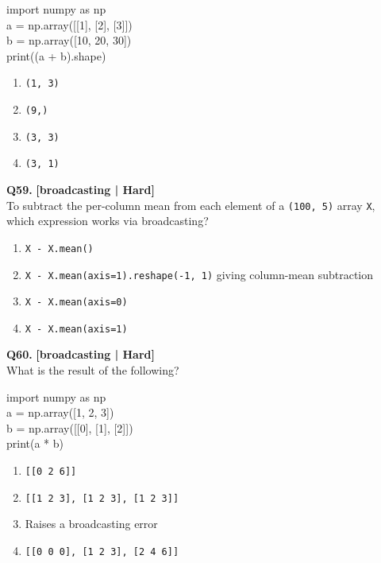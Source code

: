 \begin{pycode}
import numpy as np\\
a = np.array([[1], [2], [3]])\\
b = np.array([10, 20, 30])\\
print((a + b).shape)
\end{pycode}

\begin{enumerate}[label=(\alph*),topsep=2pt,itemsep=1pt,partopsep=0pt,parsep=0pt]
    \item \relax \texttt{(1, 3)}
    \item \relax \texttt{(9,)}
    \item \relax \texttt{(3, 3)}
    \item \relax \texttt{(3, 1)}
\end{enumerate}
\vspace{2mm}

\noindent\textbf{Q59.} \hfill {\small\color{LPUOrange}\textbf{[broadcasting | Hard]}}\\[2pt]
To subtract the per-column mean from each element of a \texttt{(100, 5)} array \texttt{X}, which expression works via broadcasting?

\begin{enumerate}[label=(\alph*),topsep=2pt,itemsep=1pt,partopsep=0pt,parsep=0pt]
    \item \relax \texttt{X - X.mean()}
    \item \relax \texttt{X - X.mean(axis=1).reshape(-1, 1)} giving column-mean subtraction
    \item \relax \texttt{X - X.mean(axis=0)}
    \item \relax \texttt{X - X.mean(axis=1)}
\end{enumerate}
\vspace{2mm}

\noindent\textbf{Q60.} \hfill {\small\color{LPUOrange}\textbf{[broadcasting | Hard]}}\\[2pt]
What is the result of the following? 

\begin{pycode}
import numpy as np\\
a = np.array([1, 2, 3])\\
b = np.array([[0], [1], [2]])\\
print(a * b)
\end{pycode}

\begin{enumerate}[label=(\alph*),topsep=2pt,itemsep=1pt,partopsep=0pt,parsep=0pt]
    \item \relax \texttt{[[0 2 6]]}
    \item \relax \texttt{[[1 2 3], [1 2 3], [1 2 3]]}
    \item \relax Raises a broadcasting error
    \item \relax \texttt{[[0 0 0], [1 2 3], [2 4 6]]}
\end{enumerate}
\vspace{2mm}


